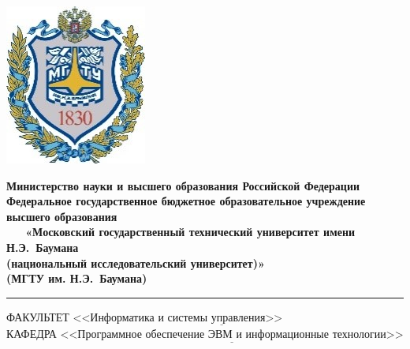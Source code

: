 \thispagestyle{empty}
\begin{titlepage}

\noindent \begin{minipage}{0.15\textwidth}
	\includegraphics[width=\linewidth]{b_logo}
	\end{minipage}
	\noindent\begin{minipage}{0.9\textwidth}\centering
		\textbf{Министерство науки и высшего образования Российской Федерации}\\
		\textbf{Федеральное государственное бюджетное образовательное учреждение высшего образования}\\
		\textbf{~~~«Московский государственный технический университет имени Н.Э.~Баумана}\\
		\textbf{(национальный исследовательский университет)»}\\
		\textbf{(МГТУ им. Н.Э.~Баумана)}
	\end{minipage}
	
	\noindent\rule{18cm}{3pt}
	\newline\newline
	\noindent ФАКУЛЬТЕТ $\underline{\text{<<Информатика и системы управления>>~~~~~~~~~~~~~~~~~~~~~~~~}}$ \newline\newline
	\noindent КАФЕДРА $\underline{\text{<<Программное обеспечение ЭВМ и информационные технологии>>}}$\newline\newline\newline
	

\end{titlepage}
